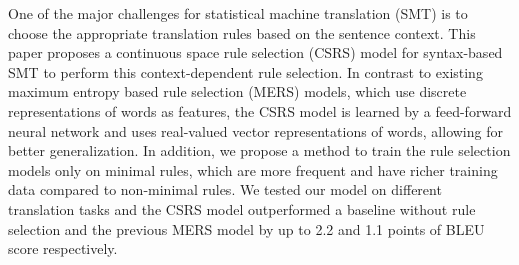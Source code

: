 One of the major challenges for statistical machine translation (SMT) is to choose the appropriate translation rules based on the sentence context. This paper proposes a continuous space rule selection (CSRS) model for syntax-based SMT to perform this context-dependent rule selection. In contrast to existing maximum entropy based rule selection (MERS) models, which use discrete representations of words as features, the CSRS model is learned by a feed-forward neural network and uses real-valued vector representations of words, allowing for better generalization. In addition, we propose a method to train the rule selection models only on minimal rules, which are more frequent and have richer training data compared to non-minimal rules.  We tested our model on different translation tasks and the CSRS model outperformed a baseline without rule selection and the previous MERS model by up to  2.2 and 1.1 points of BLEU score respectively.
